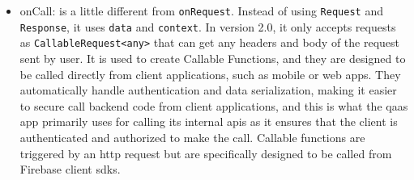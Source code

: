 \begin{itemize}
      \item onCall: is a little different from  \texttt{onRequest}. Instead of using \texttt{Request} and \texttt{Response}, it
            uses \texttt{data} and \texttt{context}. In version 2.0, it only accepts requests as \texttt{CallableRequest<any>} that can get
            any headers and body of the request sent by user. It is used to create Callable Functions, and they are designed to be called
            directly from client applications, such as mobile or web apps. They automatically handle authentication and data serialization,
            making it easier to secure call backend code from client applications, and this is what the \acrshort{qaas} app
            primarily uses for calling its internal \acrshort{api}s as it ensures that the client is authenticated and authorized
            to make the call. Callable functions are triggered by an \acrshort{http} request but are specifically designed to be
            called from Firebase client \acrshort{sdk}s.

\end{itemize}

